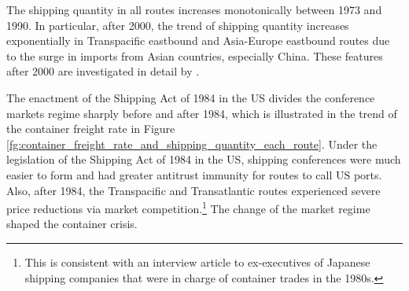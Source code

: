 \documentclass[11pt]{article}
\begin{document}
The shipping quantity in all routes increases monotonically between 1973 and 1990. In particular, after 2000, the trend of shipping quantity increases exponentially in Transpacific eastbound and Asia-Europe eastbound routes due to the surge in imports from Asian countries, especially China. These features after 2000 are investigated in detail by \cite{jeon2022learning}. 

The enactment of the Shipping Act of 1984 in the US divides the conference markets regime sharply before and after 1984, which is illustrated in the trend of the container freight rate in Figure \ref{fg:container_freight_rate_and_shipping_quantity_each_route}. Under the legislation of the Shipping Act of 1984 in the US, shipping conferences were much easier to form and had greater antitrust immunity for routes to call US ports. Also, after 1984, the Transpacific and Transatlantic routes experienced severe price reductions via market competition.\footnote{This is consistent with an interview article to ex-executives of Japanese shipping companies \citep{JapanMaritimeDaily2006} that were in charge of container trades in the 1980s.} The change of the market regime shaped the container crisis.
\end{document}
